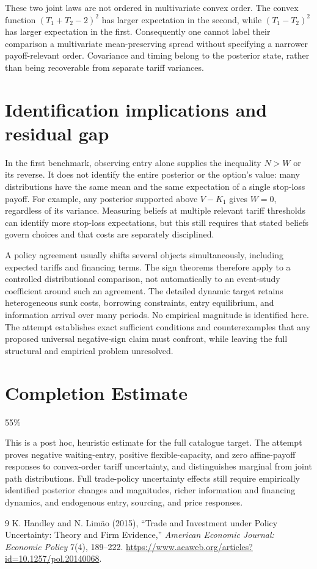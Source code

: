 \documentclass[11pt]{article}
\theoremstyle{definition}
\begin{document}
These two joint laws are not ordered in multivariate convex order. The convex function $(T_1+T_2-2)^2$ has larger expectation in the second, while $(T_1-T_2)^2$ has larger expectation in the first. Consequently one cannot label their comparison a multivariate mean-preserving spread without specifying a narrower payoff-relevant order. Covariance and timing belong to the posterior state, rather than being recoverable from separate tariff variances.

\section*{Identification implications and residual gap}
In the first benchmark, observing entry alone supplies the inequality $N>W$ or its reverse. It does not identify the entire posterior or the option's value: many distributions have the same mean and the same expectation of a single stop-loss payoff. For example, any posterior supported above $V-K_1$ gives $W=0$, regardless of its variance. Measuring beliefs at multiple relevant tariff thresholds can identify more stop-loss expectations, but this still requires that stated beliefs govern choices and that costs are separately disciplined.

A policy agreement usually shifts several objects simultaneously, including expected tariffs and financing terms. The sign theorems therefore apply to a controlled distributional comparison, not automatically to an event-study coefficient around such an agreement. The detailed dynamic target retains heterogeneous sunk costs, borrowing constraints, entry equilibrium, and information arrival over many periods. No empirical magnitude is identified here. The attempt establishes exact sufficient conditions and counterexamples that any proposed universal negative-sign claim must confront, while leaving the full structural and empirical problem unresolved.

\section{Completion Estimate}
55\%

This is a post hoc, heuristic estimate for the full catalogue target.
The attempt proves negative waiting-entry, positive flexible-capacity, and zero affine-payoff responses to convex-order tariff uncertainty, and distinguishes marginal from joint path distributions. Full trade-policy uncertainty effects still require empirically identified posterior changes and magnitudes, richer information and financing dynamics, and endogenous entry, sourcing, and price responses.

\begin{thebibliography}{9}
 K. Handley and N. Lim\~ao (2015), ``Trade and Investment under Policy Uncertainty: Theory and Firm Evidence,'' \emph{American Economic Journal: Economic Policy} 7(4), 189--222. \url{https://www.aeaweb.org/articles?id=10.1257/pol.20140068}.
\end{thebibliography}
\end{document}
